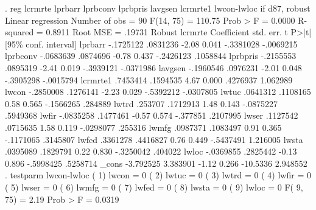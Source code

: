 . reg lcrmrte lprbarr lprbconv lprbpris lavgsen lcrmrte1 lwcon-lwloc if d87, robust
{\smallskip}
Linear regression                               Number of obs     =         90
                                                F(14, 75)         =     110.75
                                                Prob > F          =     0.0000
                                                R-squared         =     0.8911
                                                Root MSE          =     .19731
{\smallskip}
             {\VBAR}               Robust
     lcrmrte {\VBAR} Coefficient  std. err.      t    P>|t|     [95\% conf. interval]
     lprbarr {\VBAR}  -.1725122   .0831236    -2.08   0.041    -.3381028   -.0069215
    lprbconv {\VBAR}  -.0683639   .0874696    -0.78   0.437    -.2426123    .1058844
    lprbpris {\VBAR}  -.2155553   .0895319    -2.41   0.019    -.3939121   -.0371986
     lavgsen {\VBAR}  -.1960546   .0976231    -2.01   0.048    -.3905298   -.0015794
    lcrmrte1 {\VBAR}   .7453414   .1594535     4.67   0.000     .4276937    1.062989
       lwcon {\VBAR}  -.2850008   .1276141    -2.23   0.029    -.5392212   -.0307805
       lwtuc {\VBAR}   .0641312   .1108165     0.58   0.565    -.1566265     .284889
       lwtrd {\VBAR}    .253707   .1712913     1.48   0.143    -.0875227    .5949368
       lwfir {\VBAR}  -.0835258   .1477461    -0.57   0.574     -.377851    .2107995
       lwser {\VBAR}   .1127542   .0715635     1.58   0.119    -.0298077     .255316
       lwmfg {\VBAR}   .0987371   .1083497     0.91   0.365    -.1171065    .3145807
       lwfed {\VBAR}   .3361278   .4416827     0.76   0.449    -.5437491    1.216005
       lwsta {\VBAR}   .0395089   .1829791     0.22   0.830    -.3250042     .404022
       lwloc {\VBAR}  -.0369855   .2825442    -0.13   0.896    -.5998425    .5258714
       _cons {\VBAR}  -3.792525   3.383901    -1.12   0.266     -10.5336    2.948552
{\smallskip}
. testparm lwcon-lwloc
{\smallskip}
 ( 1)  lwcon = 0
 ( 2)  lwtuc = 0
 ( 3)  lwtrd = 0
 ( 4)  lwfir = 0
 ( 5)  lwser = 0
 ( 6)  lwmfg = 0
 ( 7)  lwfed = 0
 ( 8)  lwsta = 0
 ( 9)  lwloc = 0
{\smallskip}
       F(  9,    75) =    2.19
            Prob > F =    0.0319
{\smallskip}
